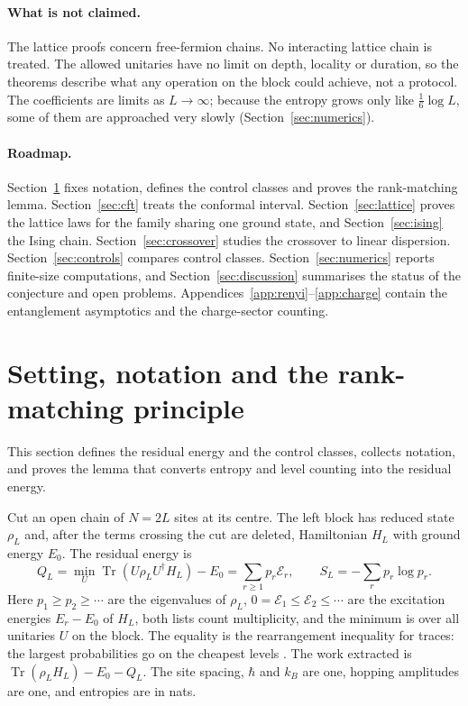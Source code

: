 \documentclass[11pt,a4paper]{article}
\theoremstyle{remark}
\newcommand{\Tr}{\operatorname{Tr}}
\begin{document}
\paragraph{What is not claimed.} The lattice proofs concern free-fermion chains. No interacting lattice chain is treated. The allowed unitaries have no limit on depth, locality or duration, so the theorems describe what any operation on the block could achieve, not a protocol. The coefficients are limits as $L\to\infty$; because the entropy grows only like $\tfrac16\log L$, some of them are approached very slowly (Section~\ref{sec:numerics}).

\paragraph{Roadmap.} Section~\ref{sec:setting} fixes notation, defines the control classes and proves the rank-matching lemma. Section~\ref{sec:cft} treats the conformal interval. Section~\ref{sec:lattice} proves the lattice laws for the family sharing one ground state, and Section~\ref{sec:ising} the Ising chain. Section~\ref{sec:crossover} studies the crossover to linear dispersion. Section~\ref{sec:controls} compares control classes. Section~\ref{sec:numerics} reports finite-size computations, and Section~\ref{sec:discussion} summarises the status of the conjecture and open problems. Appendices~\ref{app:renyi}--\ref{app:charge} contain the entanglement asymptotics and the charge-sector counting.

\section{Setting, notation and the rank-matching principle}\label{sec:setting}
This section defines the residual energy and the control classes, collects notation, and proves the lemma that converts entropy and level counting into the residual energy.

Cut an open chain of $N=2L$ sites at its centre. The left block has reduced state $\rho_L$ and, after the terms crossing the cut are deleted, Hamiltonian $H_L$ with ground energy $E_0$. The residual energy is
\begin{equation}
 Q_L=\min_U\Tr(U\rho_L U^\dagger H_L)-E_0=\sum_{r\ge1}p_r\mathcal E_r,\qquad S_L=-\sum_r p_r\log p_r .
 \label{eq:def}
\end{equation}
Here $p_1\ge p_2\ge\cdots$ are the eigenvalues of $\rho_L$, $0=\mathcal E_1\le\mathcal E_2\le\cdots$ are the excitation energies $E_r-E_0$ of $H_L$, both lists count multiplicity, and the minimum is over all unitaries $U$ on the block. The equality is the rearrangement inequality for traces: the largest probabilities go on the cheapest levels \cite{allahverdyan}. The work extracted is $\Tr(\rho_LH_L)-E_0-Q_L$. The site spacing, $\hbar$ and $k_B$ are one, hopping amplitudes are one, and entropies are in nats.
\end{document}
